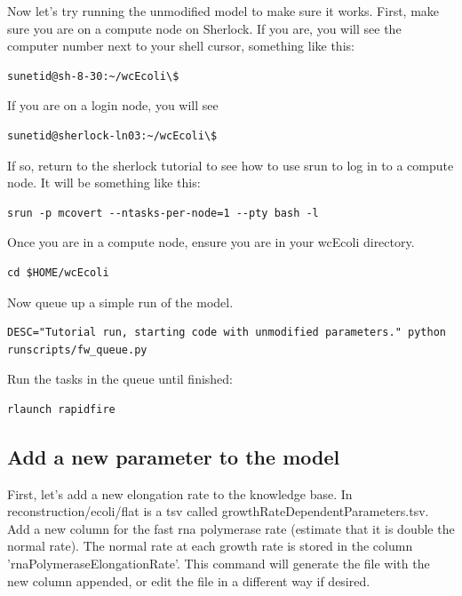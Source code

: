 \documentclass[12pt]{article}
\begin{document}
Now let's try running the unmodified model to make sure it works. First, make sure you are on a compute node on Sherlock. If you are, you will see the computer number next to your shell cursor, something like this:

\lstset{language=bash}
\begin{lstlisting}
sunetid@sh-8-30:~/wcEcoli\$
\end{lstlisting}

If you are on a login node, you will see

\lstset{language=bash}
\begin{lstlisting}
sunetid@sherlock-ln03:~/wcEcoli\$
\end{lstlisting}

If so, return to the sherlock tutorial to see how to use srun to log in to a compute node. It will be something like this:

\lstset{language=bash}
\begin{lstlisting}
srun -p mcovert --ntasks-per-node=1 --pty bash -l
\end{lstlisting}

Once you are in a compute node, ensure you are in your wcEcoli directory.

\lstset{language=bash}
\begin{lstlisting}
cd $HOME/wcEcoli
\end{lstlisting}

Now queue up a simple run of the model.

\lstset{language=bash}
\begin{lstlisting}
DESC="Tutorial run, starting code with unmodified parameters." python runscripts/fw_queue.py
\end{lstlisting}

Run the tasks in the queue until finished:

\begin{lstlisting}
rlaunch rapidfire
\end{lstlisting}



\subsection{Add a new parameter to the model}

First, let’s add a new elongation rate to the knowledge base. In reconstruction/ecoli/flat is a tsv called growthRateDependentParameters.tsv. Add a new column for the fast rna polymerase rate (estimate that it is double the normal rate). The normal rate at each growth rate is stored in the column 'rnaPolymeraseElongationRate'. This command will generate the file with the new column appended, or edit the file in a different way if desired.
\end{document}
